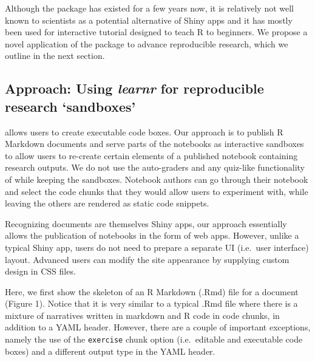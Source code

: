 Although the  package has existed for a few years now,
it is relatively not well known to scientists as a potential alternative
of Shiny apps and it has mostly been used for interactive tutorial
designed to teach R to beginners. We propose a novel application of the
 package to advance reproducible research, which we
outline in the next section.

\hypertarget{approach-using-learnr-for-reproducible-research-sandboxes}{%
\subsection{\texorpdfstring{Approach: Using \emph{learnr} for
reproducible research
`sandboxes'}{Approach: Using learnr for reproducible research `sandboxes'}}\label{approach-using-learnr-for-reproducible-research-sandboxes}}

 allows users to create executable code boxes. Our
approach is to publish R Markdown documents and serve parts of the
notebooks as interactive sandboxes to allow users to re-create certain
elements of a published notebook containing research outputs. We do not
use the auto-graders and any quiz-like functionality of 
while keeping the sandboxes. Notebook authors can go through their
notebook and select the code chunks that they would allow users to
experiment with, while leaving the others are rendered as static code
snippets.

Recognizing  documents are themselves Shiny apps, our
approach essentially allows the publication of notebooks in the form of
web apps. However, unlike a typical Shiny app, users do not need to
prepare a separate UI (i.e.~user interface) layout. Advanced users can
modify the site appearance by supplying custom design in CSS files.

Here, we first show the skeleton of an R Markdown (.Rmd) file for a
 document (Figure 1). Notice that it is very similar to
a typical .Rmd file where there is a mixture of narratives written in
markdown and R code in code chunks, in addition to a YAML header.
However, there are a couple of important exceptions, namely the use of
the \texttt{exercise} chunk option (i.e.~editable and executable code
boxes) and a different output type in the YAML header.

